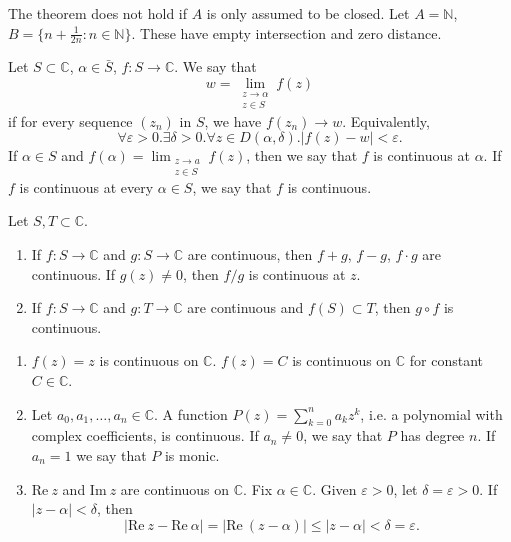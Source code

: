 \begin{xmpl}
  The theorem does not hold if $A$ is only assumed to be closed.
  Let $A = \mathbb{N}$, $B = \{ n + \frac{1}{2n} : n \in \mathbb{N} \}$.
  These have empty intersection and zero distance.
\end{xmpl}

Let $S \subset \mathbb{C}$, $\alpha \in \bar{S}$, $f : S \to \mathbb{C}$.
We say that
$$
w = \lim_{\substack{z \to \alpha \\ z \in S}} f(z)
$$
if for every sequence $(z_n)$ in $S$, we have $f(z_n) \to w$. Equivalently,
$$
\forall \varepsilon > 0 .
\exists \delta > 0 .
\forall z \in D(\alpha, \delta) . |f(z) - w| < \varepsilon.
$$
If $\alpha \in S$ and
$f(\alpha) = \lim_{\substack{z \to a \\ z \in S}} f(z)$, then
we say that $f$ is continuous at $\alpha$. If $f$ is continuous at every
$\alpha \in S$, we say that $f$ is continuous.

\begin{theorem}
  Let $S, T \subset \mathbb{C}$.
  \begin{enumerate}
    \item{
      If $f : S \to \mathbb{C}$ and
      $g: S \to \mathbb{C}$ are continuous, then $f + g$, $f - g$,
      $f \cdot g$ are continuous. If $g(z) \neq 0$, then
      $f / g$ is continuous at $z$.
    }
    \item{
      If $f : S \to \mathbb{C}$ and $g : T \to \mathbb{C}$ are continuous
      and $f(S) \subset T$, then $g \circ f$ is continuous.
    }
  \end{enumerate}
\end{theorem}

\begin{xmpl}
  \begin{enumerate}
    \item{
      $f(z) = z$ is continuous on $\mathbb{C}$.
      $f(z) = C$ is continuous on $\mathbb{C}$ for constant
      $C \in \mathbb{C}$.
    }
    \item{
      Let $a_0, a_1, \dots, a_n \in \mathbb{C}$. A function
      $P(z) = \sum_{k=0}^n a_k z^k$, i.e. a polynomial with
      complex coefficients, is continuous. If $a_n \neq 0$,
      we say that $P$ has degree $n$. If $a_n = 1$ we say
      that $P$ is monic.
    }
    \item{
      $\mathrm{Re}~z$ and $\mathrm{Im}~z$ are continuous on $\mathbb{C}$.
      Fix $\alpha \in \mathbb{C}$. Given $\varepsilon > 0$, let
      $\delta = \varepsilon > 0$. If $|z - \alpha| < \delta$, then
      $$
           |\mathrm{Re}~z - \mathrm{Re}~\alpha|
      =    |\mathrm{Re}~(z - \alpha)|
      \leq |z - \alpha| < \delta = \varepsilon.
      $$
    }
  \end{enumerate}
\end{xmpl}

